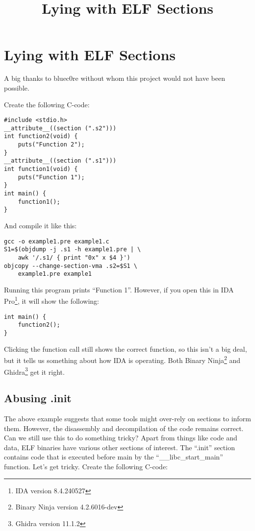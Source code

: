 \documentclass[twocolumn]{article}
\begin{document}
\title{Lying with ELF Sections}
\date{}

\section*{Lying with ELF Sections}
\vspace*{-0.5\baselineskip}

A big thanks to bluec0re without whom this project would not have been possible. 

Create the following C-code:

\begin{verbatim}
#include <stdio.h>
__attribute__((section (".s2")))
int function2(void) {
    puts("Function 2");
}
__attribute__((section (".s1")))
int function1(void) {
    puts("Function 1");
}
int main() {
    function1();
}
\end{verbatim}

And compile it like this:

\begin{verbatim}
gcc -o example1.pre example1.c 
S1=$(objdump -j .s1 -h example1.pre | \
    awk '/.s1/ { print "0x" x $4 }')
objcopy --change-section-vma .s2=$S1 \
    example1.pre example1
\end{verbatim}

Running this program prints ``Function 1''. However, if you open this in IDA Pro\footnote{IDA version 8.4.240527}, it will show the following:

\begin{verbatim}
int main() {
    function2();
}
\end{verbatim}

Clicking the function call still shows the correct function, so this isn't a big deal, but it tells us something about how IDA is operating. Both Binary Ninja\footnote{Binary Ninja version 4.2.6016-dev} and Ghidra\footnote{Ghidra version 11.1.2} get it right.

\vspace*{-0.5\baselineskip}
\subsection*{Abusing .init}

The above example suggests that some tools might over-rely on sections to inform them. However, the disassembly and decompilation of the code remains correct. Can we still use this to do something tricky? Apart from things like code and data, ELF binaries have various other sections of interest. The ``.init'' section contains code that is executed before main by the ``\_\_libc\_start\_main'' function. Let's get tricky. Create the following C-code:
\end{document}
